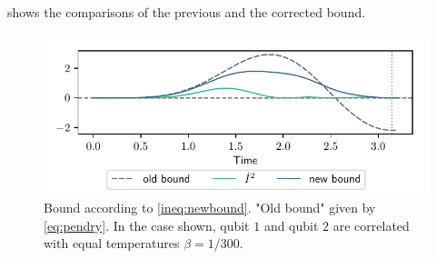 \documentclass[a4paper,11pt]{scrartcl}
\begin{document}
 shows the comparisons of the previous and the corrected bound.
\begin{figure}[H]
    \centering
    \includegraphics{corr12_beta1=beta2_new_with_old_bound.pdf}
    \caption{Bound according to \cref{ineq:newbound}. "Old bound" given by \cref{eq:pendry}.
    In the case shown, qubit $1$ and qubit $2$ are correlated with equal temperatures $\beta = 1/300$.}
    \label{fig:newbound_corr12_same_beta_with_old} 
\end{figure}
\end{document}
